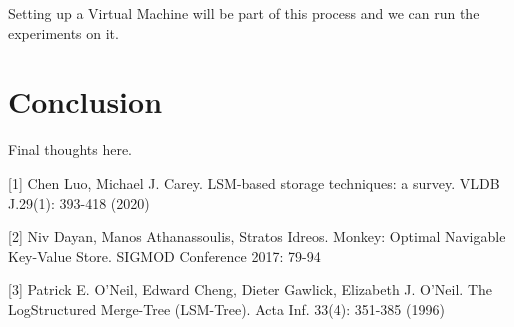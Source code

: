 \documentclass[sigconf]{acmart}
\begin{document}
    Setting up a Virtual Machine will be part of this process and we can run the experiments on it.

    \section{Conclusion}

    Final thoughts here.

        {
        
        

        [1] Chen Luo, Michael J. Carey. LSM-based storage techniques: a survey. VLDB J.29(1): 393-418 (2020)

        [2] Niv Dayan, Manos Athanassoulis, Stratos Idreos. Monkey: Optimal Navigable
        Key-Value Store. SIGMOD Conference 2017: 79-94

        [3] Patrick E. O'Neil, Edward Cheng, Dieter Gawlick, Elizabeth J. O'Neil. The LogStructured Merge-Tree (LSM-Tree). Acta Inf. 33(4): 351-385 (1996)
    }
\end{document}
